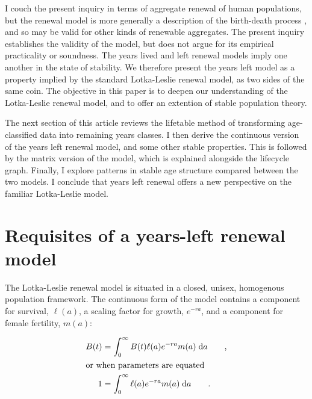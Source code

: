 \documentclass[12pt,oneside,a4paper,leqno]{article}
\newcommand{\dd}{\; \mathrm{d}}
\newcommand{\ec}{\quad\quad\text{,}}
\newcommand{\ep}{\quad\quad\text{.}}
\begin{document}
I couch the present inquiry in terms of aggregate renewal of human populations,
but the renewal model is more generally a description of the birth-death
process \citep{cox1962,feller1941integral}, and so may be valid for other kinds
of renewable aggregates.
The present inquiry establishes the validity of the model, but does not argue
for its empirical practicality or soundness.
The years lived and left renewal models imply one another in the state of stability. We
therefore present the years left model as a property implied by the
standard Lotka-Leslie renewal model, as two sides of the same coin. The objective in this paper is to deepen
our understanding of the Lotka-Leslie renewal model, and to offer an extention
of stable population theory.

The next section of this article reviews the lifetable method of transforming
age-classified data into remaining years classes. I then derive the continuous version of
the years left renewal model, and some other stable properties. This is
followed by the matrix version of the model, which is explained alongside the
lifecycle graph. Finally, I explore patterns in stable age structure compared
between the two models. I conclude that years left renewal offers
a new perspective on the familiar Lotka-Leslie model.

\section*{Requisites of a years-left renewal model}
The Lotka-Leslie renewal model \citep{sharpe1911problem, leslie1945use} is
situated in a closed, unisex, homogenous population framework. The continuous form of the model contains a component for
survival, $\ell(a)$, a scaling factor for growth, $e^{-ra}$, and a component for
female fertility, $m(a)$:

\begin{align}
\label{eq:lotka}
B(t) &= \int_{0}^\infty B(t)\ell(a)e^{-ra}m(a)\dd a \ec \\
\intertext{or when parameters are equated}
1 &= \int_{0}^\infty \ell(a)e^{-ra}m(a)\dd a \ep
\end{align}
\end{document}
